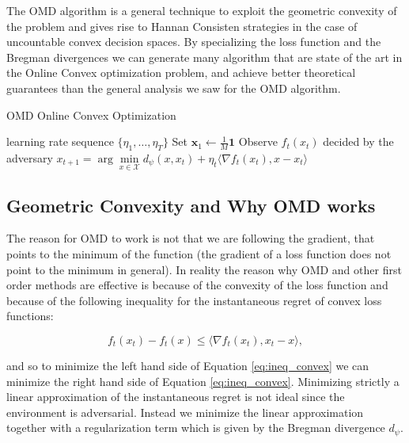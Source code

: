 The OMD algorithm is a general technique to exploit the geometric convexity of the problem and gives rise to Hannan Consisten strategies in the case of uncountable convex decision spaces. By specializing the loss function and the Bregman divergences we can generate many algorithm that are state of the art in the Online Convex optimization problem, and achieve better theoretical guarantees than the general analysis we saw for the OMD algorithm.

\begin{algorithm}[t!]
    \caption{OMD Online Convex Optimization} 
    \label{alg:OMD_in_OCO}
    \begin{algorithmic}[1]
    \REQUIRE learning rate sequence $\{\eta_1, \ldots, \eta_T\}$  \nonumber
    \STATE Set $\mathbf{x}_1 \gets \frac{1}{M} \mathbf{1}$ \label{line:init}
    \STATE Observe $f_t(x_t)$ decided by the adversary \label{line:out}
    \STATE $x_{t+1} =\arg\min\limits_{x\in\mathcal X} d_\psi(x,x_t)+\eta_t\langle\nabla f_t(x_t),x-x_t\rangle$\label{line:update}
    \ENDFOR
    \end{algorithmic}
\end{algorithm}

\subsection{Geometric Convexity and Why OMD works} 

The reason for OMD to work is not that we are following the gradient, that points to the minimum of the function (the gradient of a loss function does not point to the minimum in general). In reality the reason why OMD and other first order methods are effective is because of the convexity of the loss function and because of the following inequality for the instantaneous regret of convex loss functions:

\begin{equation}\label{eq:ineq_convex}
f_t(x_t)-f_t(x)\le\langle\nabla f_t(x_t),x_t-x\rangle,
\end{equation}

and so to minimize the left hand side of Equation \eqref{eq:ineq_convex} we can minimize the right hand side of Equation \eqref{eq:ineq_convex}. Minimizing strictly a linear approximation of the instantaneous regret is not ideal since the environment is adversarial. Instead we minimize the linear approximation together with a regularization term which is given by the Bregman divergence $d_\psi$.

